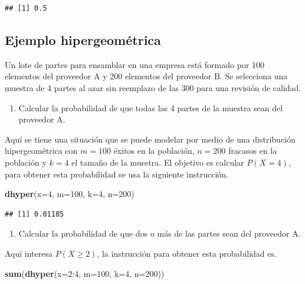 \documentclass[10pt,]{krantz}
\makeatletter
\newenvironment{Shaded}{\begin{snugshade}}{\end{snugshade}}
\newcommand{\KeywordTok}[1]{\textcolor[rgb]{0.13,0.29,0.53}{\textbf{{#1}}}}
\newcommand{\DataTypeTok}[1]{\textcolor[rgb]{0.13,0.29,0.53}{{#1}}}
\newcommand{\DecValTok}[1]{\textcolor[rgb]{0.00,0.00,0.81}{{#1}}}
\newcommand{\NormalTok}[1]{{#1}}
\providecommand{\tightlist}{%
  \setlength{\itemsep}{0pt}\setlength{\parskip}{0pt}}
\newenvironment{kframe}{%
\medskip{}
\setlength{\fboxsep}{.8em}
 \def\at@end@of@kframe{}%
 \ifinner\ifhmode%
  \def\at@end@of@kframe{\end{minipage}}%
  \begin{minipage}{\columnwidth}%
 \fi\fi%
 \def\FrameCommand##1{\hskip\@totalleftmargin \hskip-\fboxsep
 \colorbox{shadecolor}{##1}\hskip-\fboxsep
     \hskip-\linewidth \hskip-\@totalleftmargin \hskip\columnwidth}%
 \MakeFramed {\advance\hsize-\width
   \@totalleftmargin\z@ \linewidth\hsize
   \@setminipage}}%
 {\par\unskip\endMakeFramed%
 \at@end@of@kframe}
\renewenvironment{Shaded}{\begin{kframe}}{\end{kframe}}
\makeatother
\begin{document}
\begin{verbatim}
## [1] 0.5
\end{verbatim}

\subsection*{Ejemplo hipergeométrica}\label{ejemplo-hipergeometrica}


Un lote de partes para ensamblar en una empresa está formado por 100
elementos del proveedor A y 200 elementos del proveedor B. Se selecciona
una muestra de 4 partes al azar sin reemplazo de las 300 para una
revisión de calidad.

\begin{enumerate}
\def\labelenumi{\arabic{enumi})}
\tightlist
\item
  Calcular la probabilidad de que todas las 4 partes de la muestra sean
  del proveedor A.
\end{enumerate}

Aquí se tiene una situación que se puede modelar por medio de una
distribución hipergeométrica con \(m=100\) éxitos en la población,
\(n=200\) fracasos en la población y \(k=4\) el tamaño de la muestra. El
objetivo es calcular \(P(X=4)\), para obtener esta probabilidad se usa
la siguiente instrucción.

\begin{Shaded}
\begin{Highlighting}[]
\KeywordTok{dhyper}\NormalTok{(}\DataTypeTok{x=}\DecValTok{4}\NormalTok{, }\DataTypeTok{m=}\DecValTok{100}\NormalTok{, }\DataTypeTok{k=}\DecValTok{4}\NormalTok{, }\DataTypeTok{n=}\DecValTok{200}\NormalTok{)}
\end{Highlighting}
\end{Shaded}

\begin{verbatim}
## [1] 0.01185
\end{verbatim}

\begin{enumerate}
\def\labelenumi{\arabic{enumi})}
\setcounter{enumi}{1}
\tightlist
\item
  Calcular la probabilidad de que dos o más de las partes sean del
  proveedor A.
\end{enumerate}

Aquí interesa \(P(X \geq 2)\), la instrucción para obtener esta
probabilidad es.

\begin{Shaded}
\begin{Highlighting}[]
\KeywordTok{sum}\NormalTok{(}\KeywordTok{dhyper}\NormalTok{(}\DataTypeTok{x=}\DecValTok{2}\NormalTok{:}\DecValTok{4}\NormalTok{, }\DataTypeTok{m=}\DecValTok{100}\NormalTok{, }\DataTypeTok{k=}\DecValTok{4}\NormalTok{, }\DataTypeTok{n=}\DecValTok{200}\NormalTok{))}
\end{Highlighting}
\end{Shaded}
\end{document}
